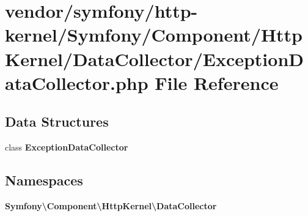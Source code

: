 \section{vendor/symfony/http-\/kernel/\+Symfony/\+Component/\+Http\+Kernel/\+Data\+Collector/\+Exception\+Data\+Collector.php File Reference}
\label{_exception_data_collector_8php}
\subsection*{Data Structures}
\begin{DoxyCompactItemize}
\item 
class {\bf Exception\+Data\+Collector}
\end{DoxyCompactItemize}
\subsection*{Namespaces}
\begin{DoxyCompactItemize}
\item 
 {\bf Symfony\textbackslash{}\+Component\textbackslash{}\+Http\+Kernel\textbackslash{}\+Data\+Collector}
\end{DoxyCompactItemize}
